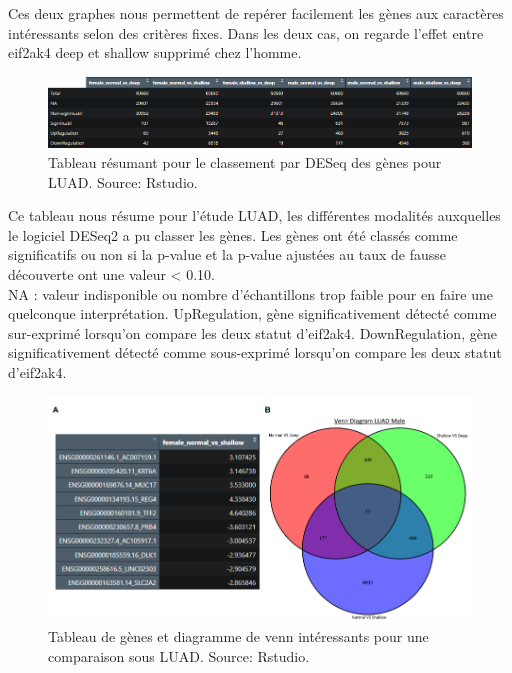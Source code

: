 \documentclass{style}
\begin{document}
Ces deux graphes nous permettent de repérer facilement les gènes aux caractères intéressants selon des critères fixes.
Dans les deux cas, on regarde l’effet entre eif2ak4 deep et shallow supprimé chez l’homme. \\

\begin{figure}[H]
  \centering
  \includegraphics[width=16cm]{images/figures/LUAD_summary.png}
  \caption[Tableau résumant pour le classement par DESeq des gènes pour LUAD.]{Tableau résumant pour le classement par DESeq des gènes pour LUAD. Source: Rstudio.}
  \label{fig:summary}
\end{figure}

Ce tableau nous résume pour l’étude LUAD, les différentes modalités auxquelles le logiciel DESeq2 a pu classer les gènes. Les gènes ont été classés comme significatifs ou non si la p-value et la p-value ajustées au taux de fausse découverte ont une valeur < 0.10. \\
NA : valeur indisponible ou nombre d'échantillons trop faible pour en faire une quelconque interprétation.
UpRegulation, gène significativement détecté comme sur-exprimé lorsqu’on compare les deux statut d’eif2ak4.
DownRegulation, gène significativement détecté comme sous-exprimé lorsqu’on compare les deux statut d’eif2ak4. \\

\begin{figure}[H]
  \centering
  \includegraphics[width=16cm]{images/figures/fvenn.png}
  \caption[Tableau de gènes et diagramme de venn intéressants pour une comparaison sous LUAD.]{Tableau de gènes et diagramme de venn intéressants pour une comparaison sous LUAD. Source: Rstudio.}
  \label{fig:fvenn}
\end{figure}
\end{document}
